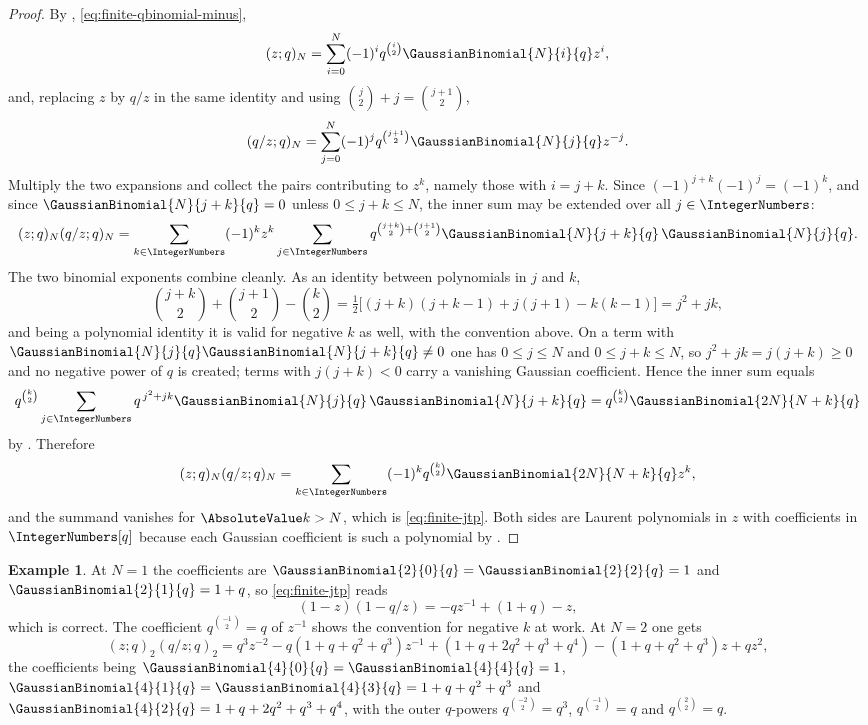 \documentclass[11pt,a4paper,oneside,openany]{book}
\theoremstyle{definition}
\newtheorem{example}[example]{Example}
\theoremstyle{remark}
\begin{document}
\begin{proof}
By , \eqref{eq:finite-qbinomial-minus},
\[
 (z;q)_N=\sum_{i=0}^{N}(-1)^iq^{\binom i2}\GaussianBinomial{N}{i}{q} z^{i},
\]
and, replacing $z$ by $q/z$ in the same identity and using $\binom j2+j=\binom{j+1}{2}$,
\[
 (q/z;q)_N=\sum_{j=0}^{N}(-1)^jq^{\binom{j+1}{2}}\GaussianBinomial{N}{j}{q} z^{-j}.
\]
Multiply the two expansions and collect the pairs contributing to $z^{k}$, namely those with $i=j+k$.  Since $(-1)^{j+k}(-1)^{j}=(-1)^k$, and since $\GaussianBinomial{N}{j+k}{q}=0$ unless $0\le j+k\le N$, the inner sum may be extended over all $j\in\IntegerNumbers$:
\[
 (z;q)_N(q/z;q)_N
 =\sum_{k\in\IntegerNumbers}(-1)^kz^{k}
 \sum_{j\in\IntegerNumbers}q^{\binom{j+k}{2}+\binom{j+1}{2}}
 \GaussianBinomial{N}{j+k}{q}\,\GaussianBinomial{N}{j}{q} .
\]
The two binomial exponents combine cleanly.  As an identity between polynomials in $j$ and $k$,
\[
 \binom{j+k}{2}+\binom{j+1}{2}-\binom k2
 =\tfrac12\bigl[(j+k)(j+k-1)+j(j+1)-k(k-1)\bigr]
 =j^2+jk,
\]
and being a polynomial identity it is valid for negative $k$ as well, with the convention above.  On a term with $\GaussianBinomial{N}{j}{q}\GaussianBinomial{N}{j+k}{q}\ne0$ one has $0\le j\le N$ and $0\le j+k\le N$, so $j^2+jk=j(j+k)\ge0$ and no negative power of $q$ is created; terms with $j(j+k)<0$ carry a vanishing Gaussian coefficient.  Hence the inner sum equals
\[
 q^{\binom k2}\sum_{j\in\IntegerNumbers}q^{\,j^2+jk}
 \GaussianBinomial{N}{j}{q}\,\GaussianBinomial{N}{j+k}{q}
 =q^{\binom k2}\GaussianBinomial{2N}{N+k}{q}
\]
by .  Therefore
\[
 (z;q)_N(q/z;q)_N
 =\sum_{k\in\IntegerNumbers}(-1)^kq^{\binom k2}\GaussianBinomial{2N}{N+k}{q}z^{k},
\]
and the summand vanishes for $\AbsoluteValue k>N$, which is \eqref{eq:finite-jtp}.  Both sides are Laurent polynomials in $z$ with coefficients in $\IntegerNumbers[q]$ because each Gaussian coefficient is such a polynomial by .
\end{proof}

\begin{example}\label{ex:finite-jtp-N1}
At $N=1$ the coefficients are $\GaussianBinomial{2}{0}{q}=\GaussianBinomial{2}{2}{q}=1$ and $\GaussianBinomial{2}{1}{q}=1+q$, so \eqref{eq:finite-jtp} reads
\[
 (1-z)(1-q/z)=-q z^{-1}+(1+q)-z,
\]
which is correct.  The coefficient $q^{\binom{-1}{2}}=q$ of $z^{-1}$ shows the convention for negative $k$ at work.  At $N=2$ one gets
\[
 (z;q)_2(q/z;q)_2
 =q^{3}z^{-2}-q(1+q+q^{2}+q^{3})z^{-1}
 +(1+q+2q^{2}+q^{3}+q^{4})
 -(1+q+q^{2}+q^{3})z+qz^{2},
\]
the coefficients being $\GaussianBinomial{4}{0}{q}=\GaussianBinomial{4}{4}{q}=1$,
$\GaussianBinomial{4}{1}{q}=\GaussianBinomial{4}{3}{q}=1+q+q^2+q^3$ and
$\GaussianBinomial{4}{2}{q}=1+q+2q^2+q^3+q^4$, with the outer $q$-powers
$q^{\binom{-2}{2}}=q^{3}$, $q^{\binom{-1}{2}}=q$ and $q^{\binom22}=q$.
\end{example}
\end{document}
